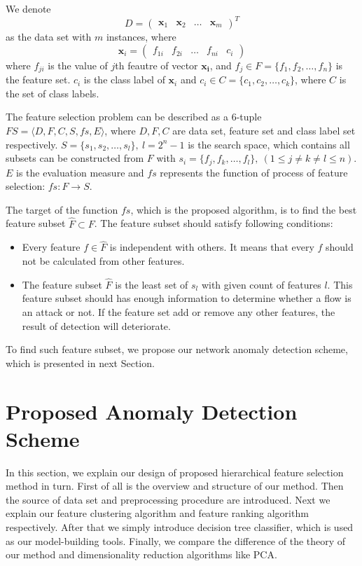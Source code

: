 \documentclass{ieeeaccess}
\theoremstyle{definition}
\begin{document}
We denote
$$
    D=\left(
        \begin{array}{llll}
            \bm{x}_1 & \bm{x}_2 & \ldots & \bm{x}_m
        \end{array}
    \right)^T
$$
as the data set with $m$ instances, where
$$
    \bm{x}_i = \left(
        \begin{array}{lllll}
            f_{1i} & f_{2i} & \ldots & f_{ni} & c_i
        \end{array}
    \right)
$$
where $f_{ji}$ is the value of $j$th feautre of vector $\bm{x_i}$, and $f_j \in F = \{f_1, f_2, \ldots, f_n\}$ is the feature set. $c_i$ is the class label of $\bm{x}_i$ and $c_i \in C = \{c_1, c_2, \ldots, c_k\}$, where $C$ is the set of class labels.

The feature selection problem\cite{Maza2018} can be described as a 6-tuple $FS=\langle D, F, C, S, fs, E \rangle$, where $D, F, C$ are data set, feature set and class label set respectively. $S=\{s_1, s_2, \ldots, s_l\}, \ l=2^n-1$ is the search space, which contains all subsets can be constructed from $F$ with $s_i=\{f_j, f_k, \ldots, f_l\}, \ (1 \leqslant j \neq k \neq l \leqslant n)$. $E$ is the evaluation measure and $fs$ represents the function of process of feature selection: $fs: F \rightarrow S$.

The target of the function $fs$, which is the proposed algorithm, is to find the best feature subset $\hat{F} \subset F$. The feature subset should satisfy following conditions:
\begin{itemize}
    \item Every feature $f \in \hat{F}$ is independent with others. It means that every $f$ should not be calculated from other features.
    \item The feature subset $\hat{F}$ is the least set of $s_l$ with given count of features $l$. This feature subset should has enough information to determine whether a flow is an attack or not. If the feature set add or remove any other features, the result of detection will deteriorate.
\end{itemize}

To find such feature subset, we propose our network anomaly detection scheme, which is presented in next Section.

\section{Proposed Anomaly Detection Scheme}
\label{sec:methods}

In this section, we explain our design of proposed hierarchical feature selection method in turn. First of all is the overview and structure of our method. Then the source of data set and preprocessing procedure are introduced. Next we explain our feature clustering algorithm and feature ranking algorithm respectively. After that we simply introduce decision tree classifier, which is used as our model-building tools. Finally, we compare the difference of the theory of our method and dimensionality reduction algorithms like PCA.
\end{document}
